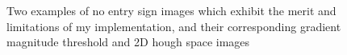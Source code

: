 \documentclass[onecolumn, 10pt, a4paper]{article}
\begin{document}
\begin{figure}[H]
  \hfill
  \caption{Two examples of no entry sign images which exhibit the merit and limitations of my implementation, and their corresponding gradient magnitude threshold and 2D hough space images}\label{fig:hough_details}
\end{figure}
\end{document}
